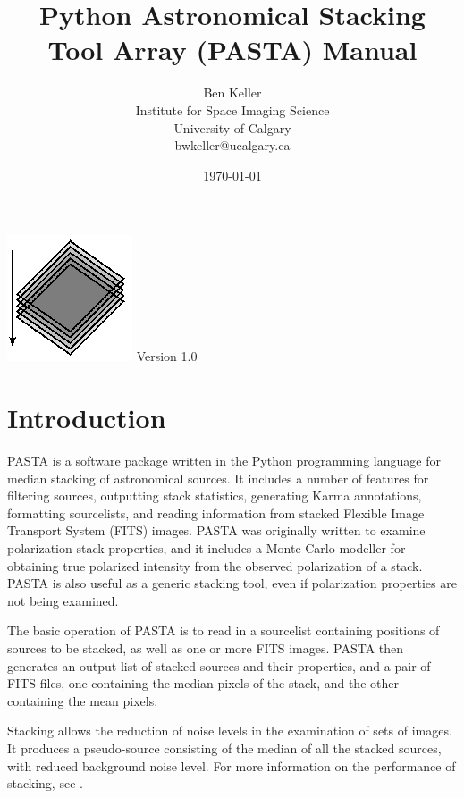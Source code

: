 \documentclass{article}
\begin{document}
\title{Python Astronomical Stacking Tool Array (PASTA) Manual}
\author{Ben Keller \\ Institute for Space Imaging Science\\
University of Calgary \\ bwkeller@ucalgary.ca}
\maketitle
\begin{center}
\includegraphics[scale=5]{PASTA_logo.eps}
\vfill
\large{Version 1.0}\\
\normalsize
\date{\today}
\end{center}
\pagebreak
\tableofcontents
\listoffigures
\listoftables
\pagebreak
\section{Introduction}
PASTA is a software package written in the Python programming language for median
stacking of astronomical sources.  It includes a number of features for 
filtering sources, outputting stack statistics, generating Karma annotations, 
formatting sourcelists, and reading information from stacked Flexible Image 
Transport System (FITS) images.  PASTA was originally written to examine 
polarization stack properties, and it includes a Monte Carlo modeller for 
obtaining true polarized intensity from the observed polarization of a stack.  
PASTA is also useful as a generic stacking tool, even if polarization properties
are not being examined.\par

The basic operation of PASTA is to read in a sourcelist containing positions of 
sources to be stacked, as well as one or more FITS images.  PASTA then generates
an output list of stacked sources and their properties, and a pair of FITS 
files, one containing the median pixels of the stack, and the other containing 
the mean pixels.

Stacking allows the reduction of noise levels in the examination of sets of 
images.  It produces a pseudo-source consisting of the median of all the stacked
sources, with reduced background noise level.  For more information on the 
performance of stacking, see \cite[Stil et al. 2010]{stil2010}.
\end{document}
